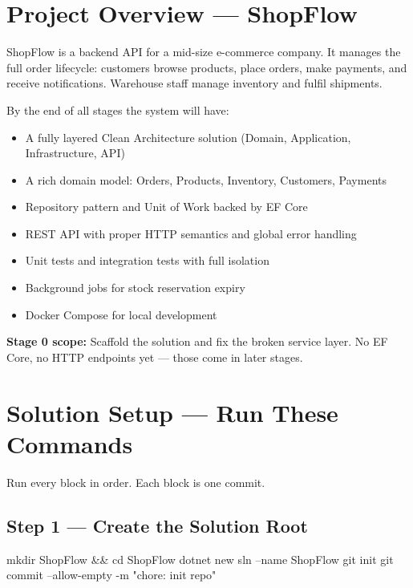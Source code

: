 \documentclass[11pt,a4paper]{article}
\begin{document}
\section{Project Overview --- ShopFlow}

ShopFlow is a backend API for a mid-size e-commerce company.
It manages the full order lifecycle: customers browse products,
place orders, make payments, and receive notifications.
Warehouse staff manage inventory and fulfil shipments.

By the end of all stages the system will have:

\begin{itemize}[leftmargin=1.5em,itemsep=3pt]
  \item A fully layered Clean Architecture solution (Domain, Application,
        Infrastructure, API)
  \item A rich domain model: Orders, Products, Inventory, Customers, Payments
  \item Repository pattern and Unit of Work backed by EF Core
  \item REST API with proper HTTP semantics and global error handling
  \item Unit tests and integration tests with full isolation
  \item Background jobs for stock reservation expiry
  \item Docker Compose for local development
\end{itemize}

\begin{notebox}
\textbf{Stage 0 scope:} Scaffold the solution and fix the broken service layer.
No EF Core, no HTTP endpoints yet --- those come in later stages.
\end{notebox}

\newpage
\section{Solution Setup --- Run These Commands}

Run every block in order. Each block is one commit.

\subsection{Step 1 --- Create the Solution Root}

\begin{codeframe}
\begin{codeblock}
mkdir ShopFlow && cd ShopFlow
dotnet new sln --name ShopFlow
git init
git commit --allow-empty -m "chore: init repo"
\end{codeblock}
\end{codeframe}
\end{document}
